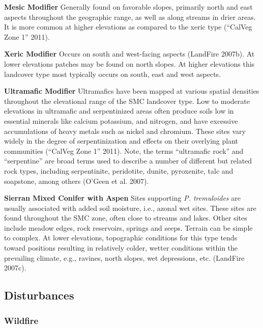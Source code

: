 \begin{adjustwidth}{2cm}{}
\textbf{Mesic Modifier } Generally found on favorable slopes, primarily north and east aspects throughout the geographic range, as well as along streams in drier areas. It is more common at higher elevations as compared to the xeric type (``CalVeg Zone 1'' 2011).

\medskip
\noindent \textbf{Xeric Modifier} Occurs on south and west-facing aspects (LandFire 2007b). At lower elevations patches may be found on north slopes. At higher elevations this landcover type most typically occurs on south, east and west aspects. 

\medskip
\noindent \textbf{Ultramafic Modifier} Ultramafics have been mapped at various spatial densities throughout the elevational range of the SMC landcover type. Low to moderate elevations in ultramafic and serpentinized areas often produce soils low in essential minerals like calcium potassium, and nitrogen, and have excessive accumulations of heavy metals such as nickel and chromium. These sites vary widely in the degree of serpentinization and effects on their overlying plant communities (``CalVeg Zone 1'' 2011). Note, the terms ``ultramafic rock'' and ``serpentine'' are broad terms used to describe a number of different but related rock types, including serpentinite, peridotite, dunite, pyroxenite, talc and soapstone, among others (O'Geen et al. 2007). 

\end{adjustwidth}

\medskip
\noindent \textbf{Sierran Mixed Conifer with Aspen} Sites supporting \emph{P. tremuloides} are usually associated with added soil moisture, i.e., azonal wet sites. These sites are found throughout the SMC zone, often close to streams and lakes. Other sites include meadow edges, rock reservoirs, springs and seeps. Terrain can be simple to complex. At lower elevations, topographic conditions for this type tends toward positions resulting in relatively colder, wetter conditions within the prevailing climate, e.g., ravines, north slopes, wet depressions, etc. (LandFire 2007c).

\subsection*{Disturbances}

\subsubsection{Wildfire}

